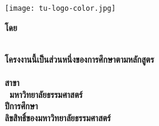 
\pagestyle{empty}
\begin{center}
	\vspace*{6mm}
	\begin{center}
		\texttt{[image: tu-logo-color.jpg]}\\
	\end{center}
	\vspace{1cm}

	\begin{spacing}{1.4}
		\textbf{\huge\titleThai}
	\end{spacing}
	\vspace*{35mm}
	\textbf{โดย}\\
	\vspace*{10mm}
	\textbf{\authorAThai}\\
	\vfill

	\begin{spacing}{1.3}
		\textbf{โครงงานนี้เป็นส่วนหนึ่งของการศึกษาตามหลักสูตร\\
			\degreeThai\\
			สาขา\majorThai\\
			\facultyThai\ มหาวิทยาลัยธรรมศาสตร์\\
			ปีการศึกษา \academicYearThai\\
			ลิขสิทธิ์ของมหาวิทยาลัยธรรมศาสตร์}
	\end{spacing}
\end{center}
